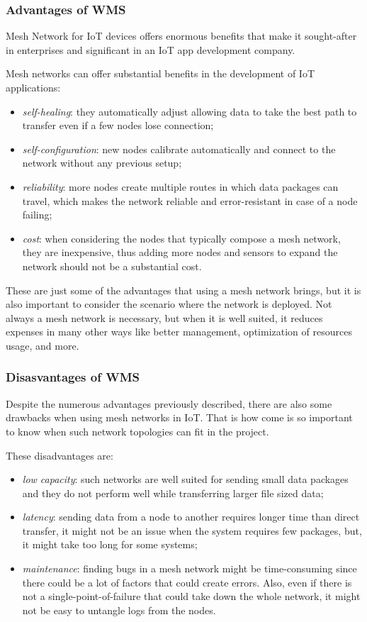 		\subsubsection{Advantages of WMS}
		
			Mesh Network for IoT devices offers enormous benefits that make it sought-after in enterprises and significant in an IoT app development company.
			
			Mesh networks can offer substantial benefits in the development of IoT applications:
			\begin{itemize}
				\item \textit{self-healing}: they automatically adjust allowing data to take the best path to transfer even if a few nodes lose connection;
				\item \textit{self-configuration}: new nodes calibrate automatically and connect to the network without any previous setup;
				\item \textit{reliability}: more nodes create multiple routes in which data packages can travel, which makes the network reliable and error-resistant in case of a node failing;
				\item \textit{cost}: when considering the nodes that typically compose a mesh network, they are inexpensive, thus adding more nodes and sensors to expand the network should not be a substantial cost.
			\end{itemize}
			
			These are just some of the advantages that using a mesh network brings, but it is also important to consider the scenario where the network is deployed.
			Not always a mesh network is necessary, but when it is well suited, it reduces expenses in many other ways like better management, optimization of resources usage, and more.
		
		\subsubsection{Disasvantages of WMS}
		
			Despite the numerous advantages previously described, there are also some drawbacks when using mesh networks in IoT.
			That is how come is so important to know when such network topologies can fit in the project.
			
			These disadvantages are:
			\begin{itemize}
				\item \textit{low capacity}: such networks are well suited for sending small data packages and they do not perform well while transferring larger file sized data;
				\item \textit{latency}: sending data from a node to another requires longer time than direct transfer, it might not be an issue when the system requires few packages, but, it might take too long for some systems;
				\item \textit{maintenance}: finding bugs in a mesh network might be time-consuming since there could be a lot of factors that could create errors. Also, even if there is not a single-point-of-failure that could take down the whole network, it might not be easy to untangle logs from the nodes.
			\end{itemize}
		
